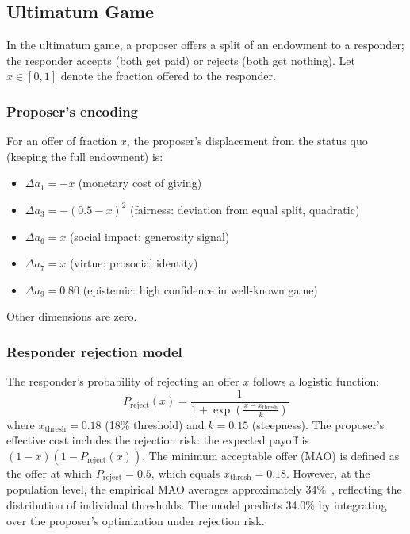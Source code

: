 \documentclass[journal]{IEEEtran}
\begin{document}
\subsection{Ultimatum Game}

In the ultimatum game, a proposer offers a split of an endowment to a responder; the responder accepts (both get paid) or rejects (both get nothing).
Let $x \in [0,1]$ denote the fraction offered to the responder.

\subsubsection{Proposer's encoding}
For an offer of fraction $x$, the proposer's displacement from the status quo (keeping the full endowment) is:
\begin{itemize}
    \item $\Delta a_1 = -x$ (monetary cost of giving)
    \item $\Delta a_3 = -(0.5 - x)^2$ (fairness: deviation from equal split, quadratic)
    \item $\Delta a_6 = x$ (social impact: generosity signal)
    \item $\Delta a_7 = x$ (virtue: prosocial identity)
    \item $\Delta a_9 = 0.80$ (epistemic: high confidence in well-known game)
\end{itemize}
Other dimensions are zero.

\subsubsection{Responder rejection model}
The responder's probability of rejecting an offer $x$ follows a logistic function:
\begin{equation}
    P_{\text{reject}}(x) = \frac{1}{1 + \exp\!\left(\frac{x - x_{\text{thresh}}}{k}\right)}
    \label{eq:rejection}
\end{equation}
where $x_{\text{thresh}} = 0.18$ (18\% threshold) and $k = 0.15$ (steepness).
The proposer's effective cost includes the rejection risk: the expected payoff is $(1-x)(1 - P_{\text{reject}}(x))$.
The minimum acceptable offer (MAO) is defined as the offer at which $P_{\text{reject}} = 0.5$, which equals $x_{\text{thresh}} = 0.18$.
However, at the population level, the empirical MAO averages approximately 34\%~\cite{camerer2003}, reflecting the distribution of individual thresholds.
The model predicts 34.0\% by integrating over the proposer's optimization under rejection risk.
\end{document}

